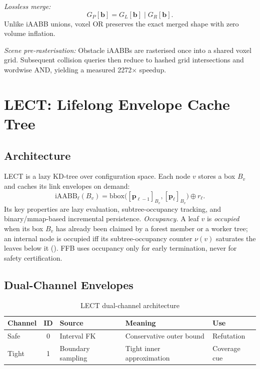 \documentclass[journal]{IEEEtran}
\newcommand{\iAABB}{\mathrm{iAABB}}
\begin{document}
\emph{Lossless merge:}
\begin{equation}
  G_P[\bm{b}] = G_L[\bm{b}] \mathbin{|} G_R[\bm{b}].
\end{equation}
Unlike iAABB unions, voxel OR preserves the exact merged shape with zero
volume inflation.

\emph{Scene pre-rasterisation:}
Obstacle iAABBs are rasterised once into a shared voxel grid. Subsequent
collision queries then reduce to hashed grid intersections and wordwise
AND, yielding a measured 2272$\times$ speedup.

\section{LECT: Lifelong Envelope Cache Tree}\label{sec:lect}

\subsection{Architecture}

LECT is a lazy KD-tree over configuration space. Each node $v$ stores a
box $B_v$ and caches its link envelopes on demand:
\begin{equation}
  \iAABB_\ell(B_v) = \mathrm{bbox}\bigl([\bm{p}_{\ell-1}]_{B_v},
  [\bm{p}_\ell]_{B_v}\bigr) \oplus r_\ell.
\end{equation}
Its key properties are lazy evaluation, subtree-occupancy tracking, and
binary/mmap-based incremental persistence.
\emph{Occupancy.} A leaf $v$ is \emph{occupied} when its box $B_v$ has
already been claimed by a forest member or a worker tree; an internal
node is occupied iff its subtree-occupancy counter $\nu(v)$ saturates
the leaves below it (). FFB uses occupancy only
for early termination, never for safety certification.

\subsection{Dual-Channel Envelopes}

\begin{table}[ht]
\centering
\caption{LECT dual-channel architecture}
\label{tab:channels}
\scriptsize
\begin{tabularx}{\columnwidth}{@{}l c l X X@{}}
\toprule
\textbf{Channel} & \textbf{ID} & \textbf{Source} & \textbf{Meaning}
  & \textbf{Use} \\
\midrule
Safe & 0 & Interval FK & Conservative outer bound & Refutation \\
Tight & 1 & Boundary sampling & Tight inner approximation & Coverage cue \\
\bottomrule
\end{tabularx}
\end{table}
\end{document}
